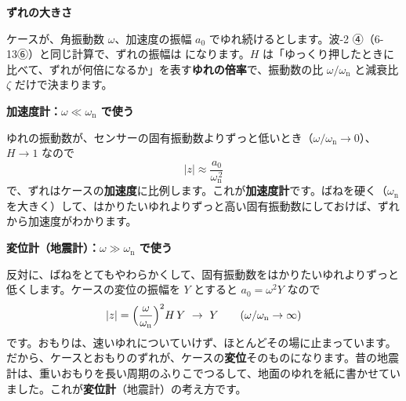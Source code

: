 \noindent\textbf{ずれの大きさ}\par\nobreak
ケースが、角振動数 $\omega$、加速度の振幅 $a_0$ でゆれ続けるとします。波-2 ④（6-13⑥）と同じ計算で、ずれの振幅は
\label{ph:波-10:H}になります。$H$ は「ゆっくり押したときに比べて、ずれが何倍になるか」を表す\textbf{ゆれの倍率}で、振動数の比 $\omega/\omega_{\mathrm n}$ と減衰比 $\zeta$ だけで決まります。

\noindent\textbf{加速度計：$\omega\ll\omega_{\mathrm n}$ で使う}\par\nobreak
ゆれの振動数が、センサーの固有振動数よりずっと低いとき（$\omega/\omega_{\mathrm n}\to0$）、$H\to1$ なので
\[ |z|\approx\frac{a_0}{\omega_{\mathrm n}^{\,2}} \]
で、ずれはケースの\textbf{加速度}に比例します。これが\textbf{加速度計}です。ばねを硬く（$\omega_{\mathrm n}$ を大きく）して、はかりたいゆれよりずっと高い固有振動数にしておけば、ずれから加速度がわかります。

\noindent\textbf{変位計（地震計）：$\omega\gg\omega_{\mathrm n}$ で使う}\par\nobreak
反対に、ばねをとてもやわらかくして、固有振動数をはかりたいゆれよりずっと低くします。ケースの変位の振幅を $Y$ とすると $a_0=\omega^2Y$ なので
\[ |z|=\Bigl(\frac{\omega}{\omega_{\mathrm n}}\Bigr)^2H\,Y\ \to\ Y\qquad(\omega/\omega_{\mathrm n}\to\infty) \]
です。おもりは、速いゆれについていけず、ほとんどその場に止まっています。だから、ケースとおもりのずれが、ケースの\textbf{変位}そのものになります。昔の地震計は、重いおもりを長い周期のふりこでつるして、地面のゆれを紙に書かせていました。これが\textbf{変位計}（地震計）の考え方です。

\begin{phflow}
\end{phflow}

